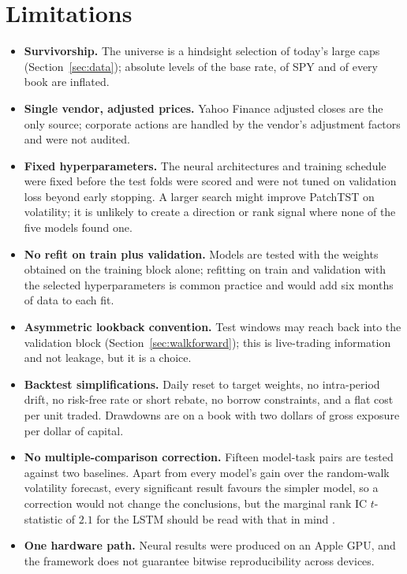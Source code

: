 \documentclass[10pt,a4paper,twoside,twocolumn]{article}
\begin{document}
\section{Limitations}\label{sec:limitations}

\begin{itemize}[leftmargin=1.4em]
\item \textbf{Survivorship.} The universe is a hindsight selection of today's large caps (Section~\ref{sec:data}); absolute levels of the base rate, of SPY and of every book are inflated.
\item \textbf{Single vendor, adjusted prices.} Yahoo Finance adjusted closes are the only source; corporate actions are handled by the vendor's adjustment factors and were not audited.
\item \textbf{Fixed hyperparameters.} The neural architectures and training schedule were fixed before the test folds were scored and were not tuned on validation loss beyond early stopping. A larger search might improve PatchTST on volatility; it is unlikely to create a direction or rank signal where none of the five models found one.
\item \textbf{No refit on train plus validation.} Models are tested with the weights obtained on the training block alone; refitting on train and validation with the selected hyperparameters is common practice and would add six months of data to each fit.
\item \textbf{Asymmetric lookback convention.} Test windows may reach back into the validation block (Section~\ref{sec:walkforward}); this is live-trading information and not leakage, but it is a choice.
\item \textbf{Backtest simplifications.} Daily reset to target weights, no intra-period drift, no risk-free rate or short rebate, no borrow constraints, and a flat cost per unit traded. Drawdowns are on a book with two dollars of gross exposure per dollar of capital.
\item \textbf{No multiple-comparison correction.} Fifteen model-task pairs are tested against two baselines. Apart from every model's gain over the random-walk volatility forecast, every significant result favours the simpler model, so a correction would not change the conclusions, but the marginal rank IC $t$-statistic of $2.1$ for the LSTM should be read with that in mind \citep{harvey2016cross}.
\item \textbf{One hardware path.} Neural results were produced on an Apple GPU, and the framework does not guarantee bitwise reproducibility across devices.
\end{itemize}
\end{document}
